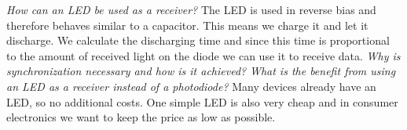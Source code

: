\textit{How can an LED be used as a receiver?}
The LED is used in reverse bias and therefore behaves similar to a capacitor. This means we charge it and let it discharge. We calculate the discharging time and since this time is proportional to the amount of received light on the diode we can use it to receive data.
\newline
\textit{Why is synchronization necessary and how is it achieved?}
\newline
\textit{What is	the	benefit	from using an LED as a receiver instead of a photodiode? }
Many devices already have an LED, so no additional costs.
One simple LED is also very cheap and in consumer electronics we want to keep the price as low as possible.
